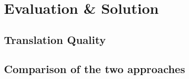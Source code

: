 \section{Evaluation & Solution}
\subsection{Translation Quality}
\subsection{Comparison of the two approaches}